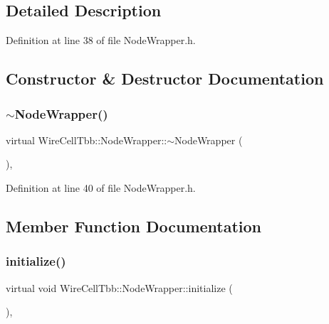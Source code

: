\subsection{Detailed Description}


Definition at line 38 of file Node\+Wrapper.\+h.



\subsection{Constructor \& Destructor Documentation}
\mbox{\label{class_wire_cell_tbb_1_1_node_wrapper_a251ffca4138c2d0a1266fe1f91bbfd3b}} 
\subsubsection{\texorpdfstring{$\sim$\+Node\+Wrapper()}{~NodeWrapper()}}
{\footnotesize\ttfamily virtual Wire\+Cell\+Tbb\+::\+Node\+Wrapper\+::$\sim$\+Node\+Wrapper (\begin{DoxyParamCaption}{ }\end{DoxyParamCaption})\hspace{0.3cm}{\ttfamily [inline]}, {\ttfamily [virtual]}}



Definition at line 40 of file Node\+Wrapper.\+h.



\subsection{Member Function Documentation}
\mbox{\label{class_wire_cell_tbb_1_1_node_wrapper_a28e71be3d95b85701c947def9d11af64}} 
\subsubsection{\texorpdfstring{initialize()}{initialize()}}
{\footnotesize\ttfamily virtual void Wire\+Cell\+Tbb\+::\+Node\+Wrapper\+::initialize (\begin{DoxyParamCaption}{ }\end{DoxyParamCaption})\hspace{0.3cm}{\ttfamily [inline]}, {\ttfamily [virtual]}}



